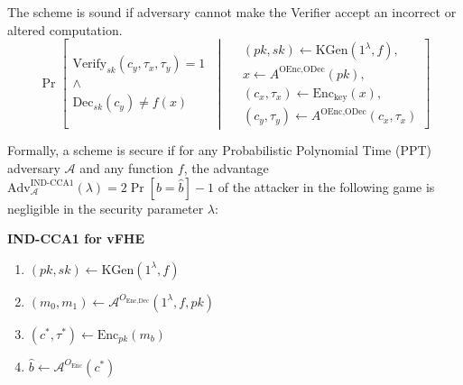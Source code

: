 \begin{definition} [Soundness]
The scheme is sound if adversary cannot make the Verifier accept an incorrect or altered computation.
\begin{equation}
\Pr\left[
\begin{array}{c}
    \text{Verify}_{sk}(c_y, \tau_x, \tau_y) = 1 \\
    \land \\
    \text{Dec}_{sk}(c_y) \neq f(x)
\end{array}
\;\middle|\;
\begin{aligned}
    &(pk, sk) \leftarrow \text{KGen}(1^\lambda,f), \\
    &x \leftarrow A^{\text{OEnc},\text{ODec}}(pk), \\
    &(c_x, \tau_x) \leftarrow \text{Enc}_{\text{key}}(x), \\
    &(c_y, \tau_y) \leftarrow A^{\text{OEnc},\text{ODec}}(c_x, \tau_x)
\end{aligned}
\right] 
\end{equation}
\end{definition}

\begin{definition}[Security]
Formally, a scheme is secure if for any Probabilistic Polynomial Time (PPT) adversary $\mathcal{A}$ and any function $f$, the advantage $\text{Adv}^{\text{IND-CCA1}}_{\mathcal{A}}(\lambda) = 2\Pr[b = \hat{b}] - 1$ of the attacker in the following game is negligible in the security parameter $\lambda$:
\begin{center}
\textbf{IND-CCA1 for vFHE}
\end{center}
\begin{enumerate}
    \item $(pk, sk) \leftarrow \text{KGen}(1^\lambda, f)$
    \item $(m_0, m_1) \leftarrow \mathcal A^{{O}_{\text{Enc},\text{Dec}}}(1^\lambda, f, pk)$
    \item $(c^*, \tau^*) \leftarrow \text{Enc}_{pk}(m_b)$
    \item $\hat{b} \leftarrow \mathcal A^{{O}_{\text{Enc}}}(c^*)$
\end{enumerate}
\end{definition}